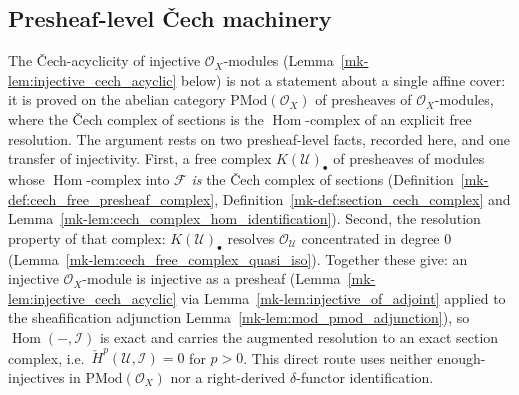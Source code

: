 \subsection{Presheaf-level {\v C}ech machinery}
\label{mk-sec:presheaf_cech_machinery}

The {\v C}ech-acyclicity of injective \(\mathcal{O}_X\)-modules
(Lemma~\ref{mk-lem:injective_cech_acyclic} below) is not a statement about a single
affine cover: it is proved on the abelian category \(\mathrm{PMod}(\mathcal{O}_X)\)
of presheaves of \(\mathcal{O}_X\)-modules, where the {\v C}ech complex of sections
is the \(\operatorname{Hom}\)-complex of an explicit free resolution. The argument
rests on two presheaf-level facts, recorded here, and one transfer of injectivity.
First, a free complex \(K(\mathcal{U})_\bullet\) of presheaves of modules whose
\(\operatorname{Hom}\)-complex into \(\mathcal{F}\) \emph{is} the {\v C}ech complex
of sections (Definition~\ref{mk-def:cech_free_presheaf_complex},
Definition~\ref{mk-def:section_cech_complex} and
Lemma~\ref{mk-lem:cech_complex_hom_identification}). Second, the resolution property of
that complex: \(K(\mathcal{U})_\bullet\) resolves \(\mathcal{O}_{\mathcal{U}}\)
concentrated in degree \(0\) (Lemma~\ref{mk-lem:cech_free_complex_quasi_iso}). Together
these give: an injective \(\mathcal{O}_X\)-module is injective as a presheaf
(Lemma~\ref{mk-lem:injective_cech_acyclic} via
Lemma~\ref{mk-lem:injective_of_adjoint} applied to the sheafification adjunction
Lemma~\ref{mk-lem:mod_pmod_adjunction}), so \(\operatorname{Hom}(-, \mathcal{I})\) is
exact and carries the augmented resolution to an exact section complex, i.e.\
\(\check{H}^p(\mathcal{U}, \mathcal{I}) = 0\) for \(p > 0\). This direct route uses
neither enough-injectives in \(\mathrm{PMod}(\mathcal{O}_X)\) nor a right-derived
\(\delta\)-functor identification.

